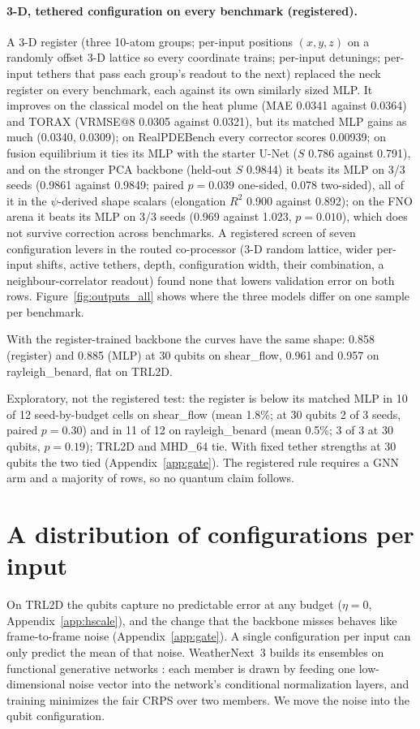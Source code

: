 \documentclass{article}
\begin{document}
\paragraph{3-D, tethered configuration on every benchmark (registered).} A 3-D register (three 10-atom
groups; per-input positions $(x,y,z)$ on a randomly offset 3-D lattice so every coordinate trains; per-input detunings;
per-input tethers that pass each group's readout to the next) replaced the neck register on every benchmark, each against
its own similarly sized MLP. It improves on the classical model on the heat plume (MAE 0.0341 against 0.0364) and TORAX
(VRMSE@8 0.0305 against 0.0321), but its matched MLP gains as much (0.0340, 0.0309); on RealPDEBench every corrector scores
0.00939; on fusion equilibrium it ties its MLP with the starter U-Net ($S$ 0.786 against 0.791), and on the stronger
PCA backbone (held-out $S$ 0.9844) it beats its MLP on 3/3 seeds (0.9861 against 0.9849; paired $p=0.039$ one-sided,
0.078 two-sided), all of it in the $\psi$-derived shape scalars (elongation $R^2$ 0.900 against 0.892); on the FNO arena it beats its MLP on 3/3 seeds
(0.969 against 1.023, $p{=}0.010$), which does not survive correction across benchmarks. A registered screen of seven
configuration levers in the routed co-processor (3-D random lattice, wider per-input shifts, active tethers, depth,
configuration width, their combination, a neighbour-correlator readout) found none that lowers validation error on both
rows. Figure~\ref{fig:outputs_all} shows where the three models differ on one sample per benchmark.

With the register-trained backbone the curves have the same shape: 0.858 (register) and 0.885 (MLP) at 30 qubits on
shear\_flow, 0.961 and 0.957 on rayleigh\_benard, flat on TRL2D.

Exploratory, not the registered test: the register is below its matched MLP in 10 of 12 seed-by-budget cells on
shear\_flow (mean 1.8\%; at 30 qubits 2 of 3 seeds, paired $p=0.30$) and in 11 of 12 on rayleigh\_benard (mean 0.5\%;
3 of 3 at 30 qubits, $p=0.19$); TRL2D and MHD\_64 tie. With fixed tether strengths at 30 qubits the two tied
(Appendix~\ref{app:gate}). The registered rule requires a GNN arm and a majority of rows, so no quantum claim follows.





\section{A distribution of configurations per input}
\label{app:fgn}
On TRL2D the qubits capture no predictable error at any budget ($\eta=0$, Appendix~\ref{app:hscale}), and the change
that the backbone misses behaves like frame-to-frame noise (Appendix~\ref{app:gate}). A single configuration per input can
only predict the mean of that noise. WeatherNext~3 \citep{rasp2026weathernext3} builds its ensembles on functional
generative networks \citep{alet2025fgn}: each member is drawn by feeding one low-dimensional noise vector into the
network's conditional normalization layers, and training minimizes the fair CRPS over two members. We move the noise
into the qubit configuration.
\end{document}
